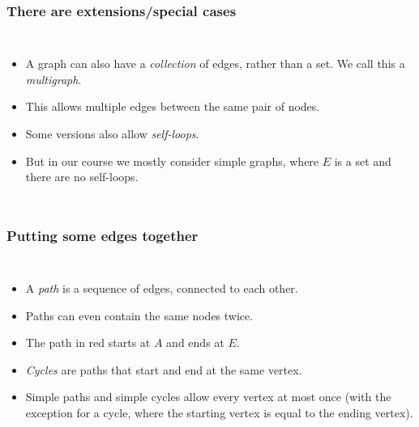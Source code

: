 \begin{frame}
	\frametitle{There are extensions/special cases}
	\begin{columns}[T]
			
		\begin{itemize}
			\item A graph can also have a \textit{collection} of edges, rather than a set. We call this a \textit{multigraph}.
				
			\item This allows multiple edges between the same pair of nodes.
				
			\item Some versions also allow \textit{self-loops}.
				
			\item But in our course we mostly consider \alert{simple} graphs, where $E$ is a set and there are no self-loops.
		\end{itemize}
	\end{columns}
\end{frame}

\begin{frame}
	\frametitle{Putting some edges together}
	\begin{columns}[T]
			
		\begin{itemize}
			\item A \textit{path} is a sequence of edges, connected to each other.
				
			\item Paths can even contain the same nodes twice.
			\item The path in \alert{red} starts at $A$ and ends at $E$.
				
			\item \textit{Cycles} are paths that start and end at the same vertex.
				
			\item Simple paths and simple cycles allow every vertex at most once (with the exception for a cycle, where the
				starting vertex is equal to the ending vertex).
		\end{itemize}
	\end{columns}
\end{frame}

